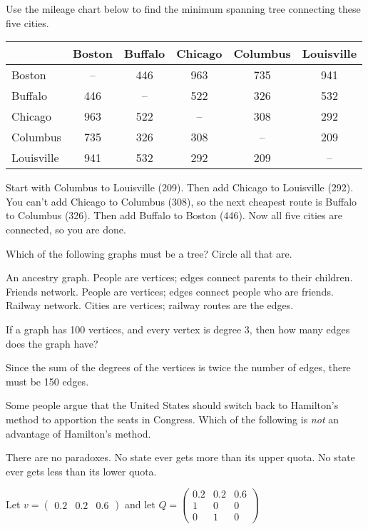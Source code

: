 \documentclass[11pt]{exam}
\begin{document}
\begin{questions}
\question Use the mileage chart below to find the minimum spanning tree connecting these five cities.  
\begin{center}
\begin{tabular}{l|ccccc}
& Boston & Buffalo & Chicago & Columbus & Louisville \\ \hline
Boston & -- & 446 & 963 & 735 & 941 \\ 
Buffalo & 446 & -- & 522 & 326 & 532 \\ 
Chicago & 963 & 522 & -- & 308 & 292 \\
Columbus & 735 & 326 & 308 & -- & 209 \\
Louisville & 941 & 532 & 292 & 209 & -- 
\end{tabular}
\end{center}
\begin{solution}
Start with Columbus to Louisville (209).  Then add Chicago to Louisville (292).  You can't add Chicago to Columbus (308), so the next cheapest route is Buffalo to Columbus (326).  Then add Buffalo to Boston (446).  Now all five cities are connected, so you are done.  
\end{solution}
\vfill

\question Which of the following graphs must be a tree?  Circle all that are.  
\begin{choices}
\CorrectChoice An ancestry graph.  People are vertices; edges connect parents to their children.
\choice Friends network.  People are vertices; edges connect people who are friends.  
\choice Railway network. Cities are vertices; railway routes are the edges.
\end{choices}
\bigskip

\question If a graph has 100 vertices, and every vertex is degree 3, then how many edges does the graph have?
\begin{solution}
Since the sum of the degrees of the vertices is twice the number of edges, there must be 150 edges. 
\end{solution}
\vfill

\question Some people argue that the United States should switch back to Hamilton's method to apportion the seats in Congress.  Which of the following is \emph{not} an advantage of Hamilton's method. 
\begin{choices}
\CorrectChoice There are no paradoxes. 
\choice No state ever gets more than its upper quota.
\choice No state ever gets less than its lower quota.
\end{choices}

\newpage
\question Let $v = \begin{pmatrix} 0.2 &  0.2 & 0.6 \end{pmatrix}$ and let $Q = \begin{pmatrix} 0.2 & 0.2 & 0.6 \\ 1 & 0 & 0 \\ 0 & 1 & 0 \end{pmatrix}$
\begin{parts}

\end{parts}
\end{questions}
\end{document}
